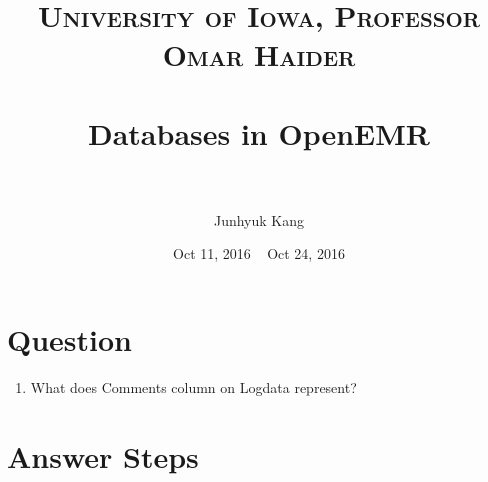 \documentclass[paper=a4, fontsize=11pt]{scrartcl} %
\title{	
\normalfont \normalsize 
\textsc{University of Iowa, Professor Omar Haider} \\ [25pt] %
\horrule{0.5pt} \\[0.4cm] %
\huge Databases in OpenEMR \\ %
\horrule{2pt} \\[0.5cm] %
}
\author{Junhyuk Kang} %
\date{Oct 11, 2016 ~ Oct 24, 2016 } %
\numberwithin{equation}{section} %
\numberwithin{figure}{section} %
\numberwithin{table}{section} %
\begin{document}
\maketitle %

\section{Question}
\begin{enumerate}
  \item What does Comments column on Logdata represent?

\end{enumerate}

\section{Answer Steps}
\end{document}
